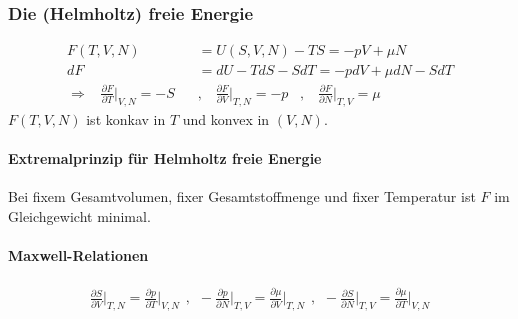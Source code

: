 \subsubsection{Die (Helmholtz) freie Energie}
\begin{align*}
    F(T,V,N) &= U(S,V,N) - T S = - p V + \mu N
    \\
    dF &= dU - T dS - S dT
    = -p dV + \mu dN - S dT
    \\
    \Rightarrow \hspace{10pt}
    \frac{\partial F}{\partial T} \Big|_{V,N} = -S
    \hspace{10pt} &, \hspace{10pt}
    \frac{\partial F}{\partial V} \Big|_{T,N} = -p
    \hspace{10pt} , \hspace{10pt}
    \frac{\partial F}{\partial N} \Big|_{T,V} = \mu
\end{align*}
$F(T,V,N)$ ist konkav in $T$ und konvex in $(V,N)$.

\paragraph{Extremalprinzip für Helmholtz freie Energie}
Bei fixem Gesamtvolumen, fixer Gesamtstoffmenge und fixer Temperatur ist $F$
im Gleichgewicht minimal.

\paragraph{Maxwell-Relationen}
\begin{align*}
    \frac{\partial S}{\partial V} \Big|_{T,N}
    = \frac{\partial p}{\partial T} \Big|_{V,N}
    \hspace{5pt} , \hspace{5pt}
    - \frac{\partial p}{\partial N} \Big|_{T,V}
    = \frac{\partial \mu}{\partial V} \Big|_{T,N}
    \hspace{5pt} , \hspace{5pt}
    - \frac{\partial S}{\partial N} \Big|_{T,V}
    = \frac{\partial \mu}{\partial T} \Big|_{V,N}
\end{align*}

